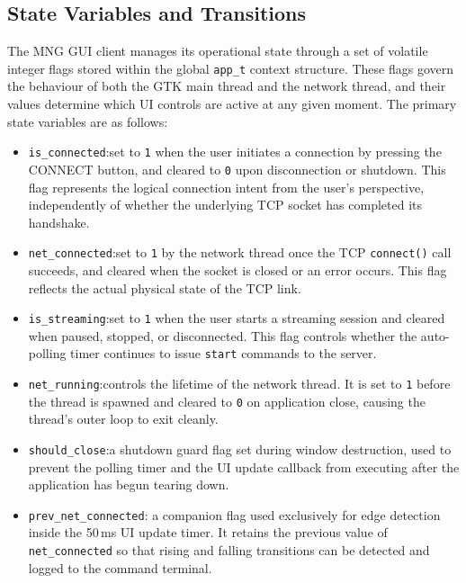 \subsection{State Variables and Transitions}

The MNG GUI client manages its operational state through a set of volatile integer
flags stored within the global \texttt{app\_t} context structure. These flags govern
the behaviour of both the GTK main thread and the network thread, and their values
determine which UI controls are active at any given moment. The primary state
variables are as follows:

\begin{itemize}
    \item \texttt{is\_connected}:set to \texttt{1} when the user initiates a
          connection by pressing the CONNECT button, and cleared to \texttt{0} upon
          disconnection or shutdown. This flag represents the logical connection
          intent from the user's perspective, independently of whether the underlying
          TCP socket has completed its handshake.

    \item \texttt{net\_connected}:set to \texttt{1} by the network thread once
          the TCP \texttt{connect()} call succeeds, and cleared when the socket is
          closed or an error occurs. This flag reflects the actual physical state of
          the TCP link.

    \item \texttt{is\_streaming}:set to \texttt{1} when the user starts a
          streaming session and cleared when paused, stopped, or disconnected. This
          flag controls whether the auto-polling timer continues to issue
          \texttt{start} commands to the server.

    \item \texttt{net\_running}:controls the lifetime of the network thread. It
          is set to \texttt{1} before the thread is spawned and cleared to \texttt{0}
          on application close, causing the thread's outer loop to exit cleanly.

    \item \texttt{should\_close}:a shutdown guard flag set during window
          destruction, used to prevent the polling timer and the UI update callback
          from executing after the application has begun tearing down.

    \item \texttt{prev\_net\_connected}: a companion flag used exclusively for
          edge detection inside the 50\,ms UI update timer. It retains the previous
          value of \texttt{net\_connected} so that rising and falling transitions can
          be detected and logged to the command terminal.
\end{itemize}

